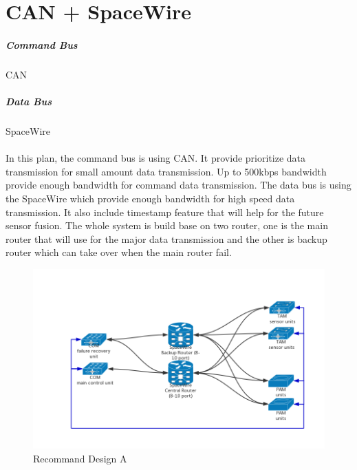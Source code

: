 \documentclass[12pt,article]{memoir}
\begin{document}
\section{CAN + SpaceWire}
\subparagraph{Command Bus}CAN
\subparagraph{Data Bus}SpaceWire\\\\
In this plan, the command bus is using CAN. It provide prioritize data transmission for small amount data transmission. Up to 500kbps bandwidth provide enough bandwidth for command data transmission. The data bus is using the SpaceWire which provide enough bandwidth for high speed data transmission. It also include timestamp feature that will help for the future sensor fusion. The whole system is build base on two router, one is the main router that will use for the major data transmission and the other is backup router which can take over when the main router fail.
\begin{figure}[htp]
\includegraphics[width=\textwidth]{img/DR00001_SpaceWire_1.png}
 \caption{Recommand Design A}	
\end{figure}
\clearpage
\end{document}
